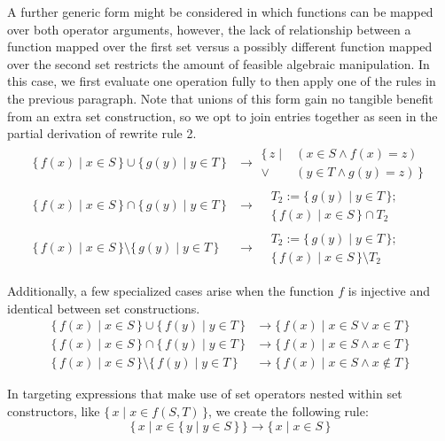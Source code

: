 \documentclass{article}
\newcommand{\Set}[2]{%
  \{\, #1 \mid #2 \, \}%
}
\begin{document}
A further generic form might be considered in which functions can be mapped over both operator arguments, however, the lack of relationship between a function mapped over the first set versus a possibly different function mapped over the second set restricts the amount of feasible algebraic manipulation. In this case, we first evaluate one operation fully to then apply one of the rules in the previous paragraph. Note that unions of this form gain no tangible benefit from an extra set construction, so we opt to join entries together as seen in the partial derivation of rewrite rule 2.
\begin{align}
  \Set{f(x)}{x \in S} \cup \Set{g(y)}{y \in T} &\rightarrow
    \begin{split}
      \Set{z}{&(x \in S \land f(x) = z) \\\lor &(y \in T \land g(y) = z)}
    \end{split}\\
  \Set{f(x)}{x \in S} \cap \Set{g(y)}{y \in T} &\rightarrow
    \begin{split}
      &T_2 := \Set{g(y)}{y \in T};\\
      &\Set{f(x)}{x \in S} \cap T_2
    \end{split}\\
  \Set{f(x)}{x \in S} \setminus \Set{g(y)}{y \in T} &\rightarrow
    \begin{split}
      &T_2 := \Set{g(y)}{y \in T};\\
      &\Set{f(x)}{x \in S} \setminus T_2
    \end{split}
\end{align}

Additionally, a few specialized cases arise when the function $f$ is injective and identical between set constructions.
\begin{align}
  \Set{f(x)}{x \in S} \cup \Set{f(y)}{y \in T} &\rightarrow \Set{f(x)}{x \in S \lor x \in T}\\
  \Set{f(x)}{x \in S} \cap \Set{f(y)}{y \in T} &\rightarrow \Set{f(x)}{x \in S \land x \in T}\\
  \Set{f(x)}{x \in S} \setminus \Set{f(y)}{y \in T} &\rightarrow \Set{f(x)}{x \in S \land x \notin T}
\end{align}

In targeting expressions that make use of set operators nested within set constructors, like $\Set{x}{x \in f(S, T)}$, we create the following rule:
\begin{equation}
  \Set{x}{x \in \Set{y}{y \in S}} \rightarrow \Set{x}{x \in S}
\end{equation}
\end{document}
